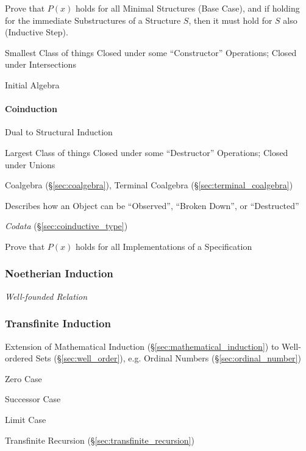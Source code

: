Prove that $P(x)$ holds for all Minimal Structures (Base Case), and if
holding for the immediate Substructures of a Structure $S$, then it
must hold for $S$ also (Inductive Step). %

Smallest Class of things Closed under some ``Constructor'' Operations;
Closed under Intersections \cite{shulman11}

Initial Algebra %



\paragraph{Coinduction}\label{sec:coinduction}\hfill

Dual to Structural Induction

Largest Class of things Closed under some ``Destructor'' Operations;
Closed under Unions \cite{shulman11}

Coalgebra (\S\ref{sec:coalgebra}), Terminal Coalgebra
(\S\ref{sec:terminal_coalgebra})

Describes how an Object can be ``Observed'', ``Broken Down'', or
``Destructed''

\emph{Codata} (\S\ref{sec:coinductive_type})

Prove that $P(x)$ holds for all Implementations of a Specification



\subsubsection{Noetherian Induction}\label{sec:noetherian_induction}

\emph{Well-founded Relation}



\subsubsection{Transfinite Induction}\label{sec:transfinite_induction}

Extension of Mathematical Induction
(\S\ref{sec:mathematical_induction}) to Well-ordered Sets
(\S\ref{sec:well_order}), e.g. Ordinal Numbers
(\S\ref{sec:ordinal_number})

Zero Case

Successor Case

Limit Case

Transfinite Recursion (\S\ref{sec:transfinite_recursion})



